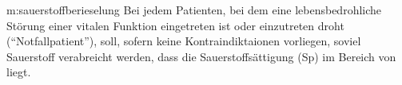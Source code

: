% 


{m:sauerstoffberieselung}
{%
Bei jedem Patienten, bei dem eine
lebensbedrohliche Störung einer vitalen Funktion eingetreten
ist oder einzutreten droht (\enquote{Notfallpatient}), soll,
sofern keine Kontraindiktaionen vorliegen, soviel Sauerstoff
verabreicht werden, dass die Sauerstoffsättigung (Sp)
im Bereich von  liegt.
% 
% 
}


